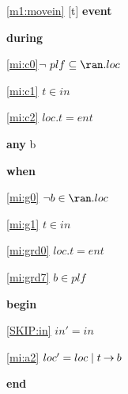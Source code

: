 \noindent \ref{m1:movein} [t] \textbf{event}
\begin{block}
\item \textbf{during}
\begin{block}
\item[ \eqref{mi:c0} ]$\!\! \neg ~ plf \subseteq \ran.loc $ %
\item[ \eqref{mi:c1} ]$t \in in $ %
\item[ \eqref{mi:c2} ]$loc.t = ent $ %
\end{block}
\item \textbf{any} b
\item \textbf{when}
\begin{block}
\item[ \eqref{mi:g0} ]$\neg b \in \ran.loc  	$ %
\item[ \eqref{mi:g1} ]$t \in in $ %
\item[ \eqref{mi:grd0} ]$loc.t = ent $ %
\item[ \eqref{mi:grd7} ]$b \in plf $ %
\end{block}
\item \textbf{begin}
\begin{block}
\item[ \eqref{SKIP:in} ]$in' = in$ %
\item[ \eqref{mi:a2} ]$loc' = loc \; | \; t \mathbin\rightarrow b $ %
\end{block}
\item \textbf{end} \\
\end{block}
